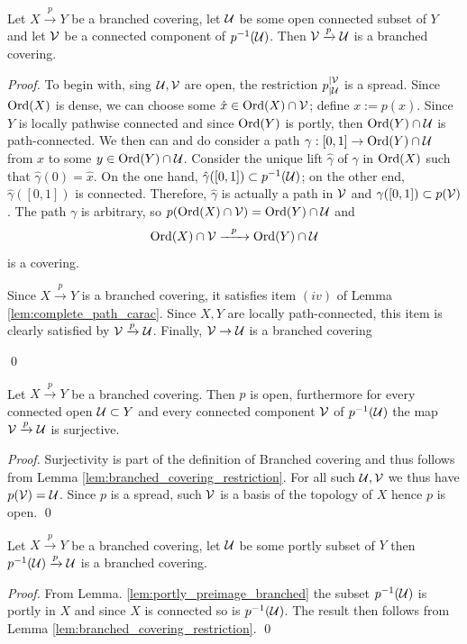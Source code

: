  


\begin{lem}[\cite{MR2198590}]\label{lem:branched_covering_restriction}
 Let $X\xrightarrow{p} Y$ be a branched covering, let $\mathcal{U}$ be some open connected subset of $Y$ and let $\mathcal V$ be a connected component of $p^{-1}(\mathcal{U})$. Then $\mathcal V\xrightarrow{p} \mathcal{U}$ is a branched covering.
\end{lem}
\begin{proof} To begin with, sing $\mathcal{U},\mathcal V$ are open, the restriction $p_{|\mathcal{U}}^{|\mathcal V}$ is a spread.
 Since $\mathrm{Ord}(X)$ is dense, we can choose some $\hat x\in \mathrm{Ord}(X)\cap \mathcal V$; define $x:=p(\hat x)$. Since $Y$ is locally pathwise connected and since $\mathrm{Ord}(Y)$ is portly, then $\mathrm{Ord}(Y)\cap \mathcal{U}$ is path-connected.  We then can and do consider a path $\gamma:[0,1]\rightarrow \mathrm{Ord}(Y)\cap\mathcal{U}$ from $x$ to some $y\in \mathrm{Ord}(Y)\cap \mathcal{U}$. Consider the unique lift $\hat\gamma$ of $\gamma$ in $\mathrm{Ord}(X)$ such that $\hat\gamma(0)=\hat x$. On the one hand, $\hat\gamma([0,1])\subset p^{-1}(\mathcal{U})$; on the other end, $\hat\gamma([0,1])$ is connected. Therefore, $\hat \gamma$ is actually a path in $\mathcal V$ and $\gamma([0,1])\subset p(\mathcal V)$. 
 The path $\gamma$ is arbitrary, so $p(\mathrm{Ord}(X)\cap \mathcal V)=\mathrm{Ord}(Y)\cap \mathcal{U}$ and  $$\mathrm{Ord}(X)\cap \mathcal V \xrightarrow{ ~~p~~} \mathrm{Ord}(Y)\cap \mathcal{U}$$ is a covering. 
 
 Since $X\xrightarrow{p} Y$ is a branched covering, it satisfies item $(iv)$ of Lemma \ref{lem:complete_path_carac}. Since $X,Y$ are locally path-connected, this item is clearly satisfied by $\mathcal V\xrightarrow{p}\mathcal{U}$. Finally, $\mathcal V\rightarrow \mathcal{U}$ is a branched covering 
 
\qed\end{proof}


\begin{cor}\label{cor:spread_connected_image}
   Let $X\xrightarrow{p} Y$ be a branched covering. Then $p$ is open, furthermore for every connected open $\mathcal{U}\subset Y$ and every connected component $\mathcal V$ of $p^{-1}(\mathcal{U})$ 
   the map $\mathcal V\xrightarrow{p} \mathcal{U}$ is surjective.
\end{cor}
\begin{proof}
Surjectivity is part of the definition of Branched covering and thus follows from Lemma \ref{lem:branched_covering_restriction}. 
  For all such $\mathcal{U},\mathcal V$ we thus have $p(\mathcal V)=\mathcal{U}$. Since $p$ is a spread, such $\mathcal V$ is a basis of the topology of $X$ hence $p$ is open.
\qed\end{proof}

\begin{cor} \label{cor:subcovering_portly}
  Let $X\xrightarrow{p} Y$ be a branched covering, let $\mathcal{U}$ be some portly subset of $Y$ then $p^{-1}(\mathcal{U})\xrightarrow{p}\mathcal{U}$ is a branched covering.
\end{cor}
\begin{proof}  From Lemma. \ref{lem:portly_preimage_branched} the subset $p^{-1}(\mathcal{U})$ is portly in $X$ and since $X$ is connected so is $p^{-1}(\mathcal{U})$. The result then follows from Lemma \ref{lem:branched_covering_restriction}.
\qed\end{proof}


